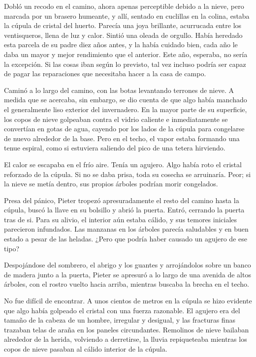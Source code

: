 Dobló un recodo en el camino, ahora apenas perceptible debido a la nieve, pero marcada por un brasero humeante, y allí, sentado en cuclillas en la colina, estaba la cúpula de cristal del huerto. Parecía una joya brillante, acurrucada entre los ventisqueros, llena de luz y calor. Sintió una oleada de orgullo. Había heredado esta parcela de su padre diez años antes, y la había cuidado bien, cada año le daba un mayor y mejor rendimiento que el anterior. Este año, esperaba, no sería la excepción. Si las cosas iban según lo previsto, tal vez incluso podría ser capaz de pagar las reparaciones que necesitaba hacer a la casa de campo.


Caminó a lo largo del camino, con las botas levantando terrones de nieve. A medida que se acercaba, sin embargo, se dio cuenta de que algo había manchado el generalmente liso exterior del invernadero. En la mayor parte de su superficie, los copos de nieve golpeaban contra el vidrio caliente e inmediatamente se convertían en gotas de agua, cayendo por los lados de la cúpula para congelarse de nuevo alrededor de la base. Pero en el techo, el vapor estaba formando una tenue espiral, como si estuviera saliendo del pico de una tetera hirviendo.



El calor se escapaba en el frío aire. Tenía un agujero. Algo había roto el cristal reforzado de la cúpula. Si no se daba prisa, toda su cosecha se arruinaría. Peor; si la nieve se metía dentro, sus propios árboles podrían morir congelados.



Presa del pánico, Pieter tropezó apresuradamente el resto del camino hasta la cúpula, buscó la llave en su bolsillo y abrió la puerta. Entró, cerrando la puerta tras de si. Para su alivio, el interior aún estaba cálido, y sus temores iniciales parecieron infundados. Las manzanas en los árboles parecía saludables y en buen estado a pesar de las heladas. ¿Pero que podría haber causado un agujero de ese tipo?



Despojándose del sombrero, el abrigo y los guantes y arrojándolos sobre un banco de madera junto a la puerta, Pieter se apresuró a lo largo de una avenida de altos árboles, con el rostro vuelto hacia arriba, mientras buscaba la brecha en el techo.



No fue difícil de encontrar. A unos cientos de metros en la cúpula se hizo evidente que algo había golpeado el cristal con una fuerza razonable. El agujero era del tamaño de la cabeza de un hombre, irregular y desigual, y las fracturas finas trazaban telas de araña en los paneles circundantes. Remolinos de nieve bailaban alrededor de la herida, volviendo a derretirse, la lluvia repiqueteaba mientras los copos de nieve pasaban al cálido interior de la cúpula.



